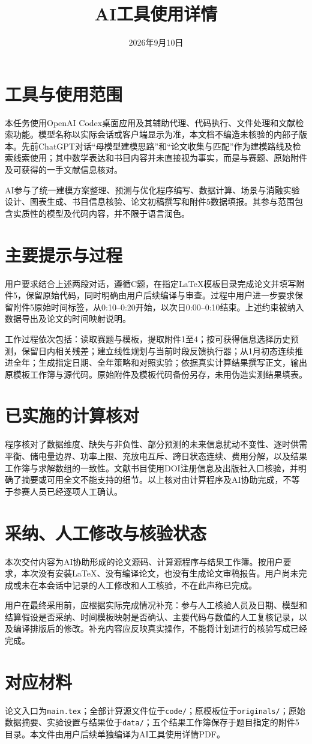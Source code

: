 \documentclass[UTF8,a4paper,11pt]{ctexart}
\title{AI工具使用详情}
\author{}
\date{2026年9月10日}
\begin{document}
\maketitle

\section{工具与使用范围}
本任务使用OpenAI Codex桌面应用及其辅助代理、代码执行、文件处理和文献检索功能。模型名称以实际会话或客户端显示为准，本文档不编造未核验的内部子版本。先前ChatGPT对话“母模型建模思路”和“论文收集与匹配”作为建模路线及检索线索使用；其中数学表达和书目内容并未直接视为事实，而是与赛题、原始附件及可获得的一手文献信息核对。

AI参与了统一建模方案整理、预测与优化程序编写、数据计算、场景与消融实验设计、图表生成、书目信息核验、论文初稿撰写和附件5数据填报。其参与范围包含实质性的模型及代码内容，并不限于语言润色。

\section{主要提示与过程}
用户要求结合上述两段对话，遵循C题，在指定LaTeX模板目录完成论文并填写附件5，保留原始代码，同时明确由用户后续编译与审查。过程中用户进一步要求保留附件5原始时间标签，从0:10--0:20开始，以次日0:00--0:10结束。上述约束被纳入数据导出及论文的时间映射说明。

工作过程依次包括：读取赛题与模板，提取附件1至4；按可获得信息选择历史预测，保留日内相关残差；建立线性规划与当前时段反馈执行器；从1月初态连续推进全年；生成指定日期、全年策略和对照实验；依据真实计算结果撰写正文，输出原模板工作簿与源代码。原始附件及模板代码备份另存，未用伪造实测结果填表。

\section{已实施的计算核对}
程序核对了数据维度、缺失与非负性、部分预测的未来信息扰动不变性、逐时供需平衡、储电量边界、功率上限、充放电互斥、跨日状态连续、费用分解，以及结果工作簿与求解数组的一致性。文献书目使用DOI注册信息及出版社入口核验，并明确了摘要或可用全文不能支持的细节。以上核对由计算程序及AI协助完成，不等于参赛人员已经逐项人工确认。

\section{采纳、人工修改与核验状态}
本次交付内容为AI协助形成的论文源码、计算源程序与结果工作簿。按用户要求，本次没有安装LaTeX、没有编译论文，也没有生成论文审稿报告。用户尚未完成或未在本会话中记录的人工修改和人工核验，不在此声称已完成。

用户在最终采用前，应根据实际完成情况补充：参与人工核验人员及日期、模型和结算假设是否采纳、时间模板映射是否确认、主要代码与数值的人工复核记录，以及编译排版后的修改。补充内容应反映真实操作，不能将计划进行的核验写成已经完成。

\section{对应材料}
论文入口为\texttt{main.tex}；全部计算源文件位于\texttt{code/}；原模板位于\texttt{originals/}；原始数据摘要、实验设置与结果位于\texttt{data/}；五个结果工作簿保存于题目指定的附件5目录。本文件由用户后续单独编译为AI工具使用详情PDF。
\end{document}
